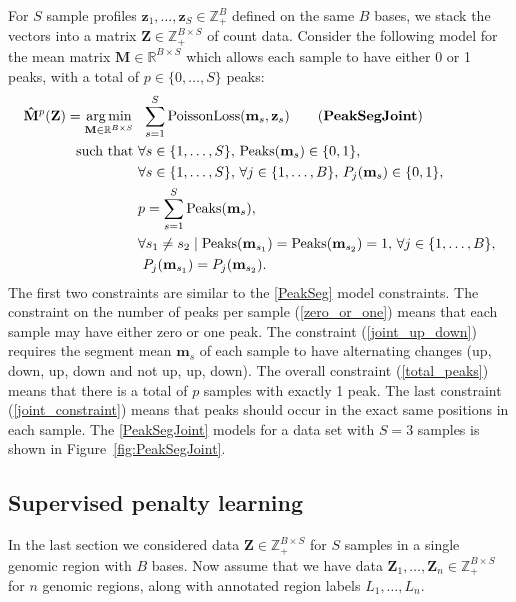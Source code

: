 \documentclass{article} %
\DeclareMathOperator*{\argmin}{arg\,min}
\DeclareMathOperator*{\Peaks}{Peaks}
\newcommand{\RR}{\mathbb R}
\newcommand{\ZZ}{\mathbb Z}
\begin{document}
For $S$ sample profiles $\mathbf z_1, \dots, \mathbf z_S\in\ZZ_+^B$
defined on the same $B$ bases, we stack the vectors into a matrix
$\mathbf Z\in\ZZ_+^{B \times S}$ of count data. Consider the following
model for the mean matrix $\mathbf M\in\RR^{B\times S}$ which allows
each sample to have either 0 or 1 peaks, with a total of $p\in\{0,
\dots, S\}$ peaks:
\begin{align}
  \label{PeakSegJoint}
  \mathbf{\hat M}^p(\mathbf Z)  =
  \argmin_{\mathbf M\in\RR^{B\times S}} &\ \ 
  \sum_{s=1}^S 
  \text{PoissonLoss}(\mathbf m_s, \mathbf z_s) 
  \tag{\textbf{PeakSegJoint}}
  \\
  \text{such that} &\ 
  \forall s\in\{1, \dots, S\},\, 
  \Peaks(\mathbf m_s)\in\{0, 1\},  
  \label{zero_or_one}
  \\
  &\ 
  \forall s\in\{1, \dots, S\},\,
  \forall j\in\{1, \dots, B\},\, P_j(\mathbf m_s) \in\{0, 1\},
  \label{joint_up_down}
  \\
  &\ 
  p = \sum_{s=1}^S \Peaks(\mathbf m_s),
  \label{total_peaks}
  \\
  &\ \forall s_1\neq s_2\mid
  \nonumber
  \Peaks(\mathbf m_{s_1})=\Peaks(\mathbf  m_{s_2})=1,\,
  \forall j\in\{1, \dots, B\},\\
  &\ \ P_j(\mathbf m_{s_1}) = P_j(\mathbf m_{s_2}).
  \label{joint_constraint}
\end{align}
The first two constraints are similar to the \ref{PeakSeg} model
constraints. The constraint on the number of peaks per sample
(\ref{zero_or_one}) means that each sample may have either zero or one
peak. The constraint (\ref{joint_up_down}) requires the segment mean
$\mathbf m_s$ of each sample to have alternating changes (up, down,
up, down and not up, up, down). The overall constraint
(\ref{total_peaks}) means that there is a total of $p$ samples with
exactly 1 peak. The last constraint (\ref{joint_constraint}) means
that peaks should occur in the exact same positions in each sample.
The \ref{PeakSegJoint} models for a data set with $S=3$ samples is
shown in Figure~\ref{fig:PeakSegJoint}.

\subsection{Supervised penalty learning}

In the last section we considered data $\mathbf Z\in\ZZ_+^{B\times S}$
for $S$ samples in a single genomic region with $B$ bases. Now assume
that we have data $\mathbf Z_1,\dots, \mathbf Z_n\in\ZZ_+^{B\times S}$
for $n$ genomic regions, along with annotated region labels
$L_1,\dots, L_n$. 
\end{document}
